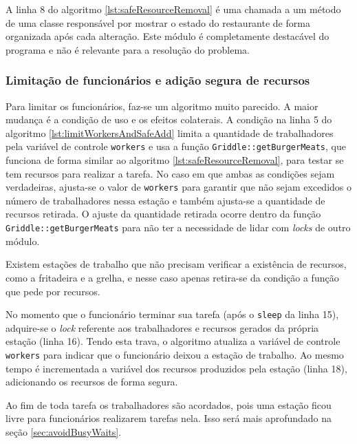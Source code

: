 \documentclass[a4paper]{article}
\begin{document}
A linha 8 do algoritmo \ref{lst:safeResourceRemoval} é uma chamada a um método de uma classe responsável por mostrar o estado do restaurante de forma organizada após cada alteração. Este módulo é completamente destacável do programa e não é relevante para a resolução do problema.

\subsubsection{Limitação de funcionários e adição segura de recursos}
\label{sec:limitWorkersAndSafeAdd}

Para limitar os funcionários, faz-se um algoritmo muito parecido. A maior mudança é a condição de uso e os efeitos colaterais. A condição na linha 5 do algoritmo \ref{lst:limitWorkersAndSafeAdd}	limita a quantidade de trabalhadores pela variável de controle \texttt{workers} e usa a função \texttt{Griddle::getBurgerMeats}, que funciona de forma similar ao algoritmo \ref{lst:safeResourceRemoval}, para testar se tem recursos para realizar a tarefa. No caso em que ambas as condições sejam verdadeiras, ajusta-se o valor de \texttt{workers} para garantir que não sejam excedidos o número de trabalhadores nessa estação e também ajusta-se a quantidade de recursos retirada. O ajuste da quantidade retirada ocorre dentro da função \texttt{Griddle::getBurgerMeats} para não ter a necessidade de lidar com \textit{locks} de outro módulo.

Existem estações de trabalho que não precisam verificar a existência de recursos, como a fritadeira e a grelha, e nesse caso apenas retira-se da condição a função que pede por recursos.

No momento que o funcionário terminar sua tarefa (após o \texttt{sleep} da linha 15), adquire-se o \textit{lock} referente aos trabalhadores e recursos gerados da própria estação (linha 16). Tendo esta trava, o algoritmo atualiza a variável de controle \texttt{workers} para indicar que o funcionário deixou a estação de trabalho. Ao mesmo tempo é incrementada a variável dos recursos produzidos pela estação (linha 18), adicionando os recursos de forma segura.

Ao fim de toda tarefa os trabalhadores são acordados, pois uma estação ficou livre para funcionários realizarem tarefas nela. Isso será mais aprofundado na seção \ref{sec:avoidBusyWaits}.
\end{document}
